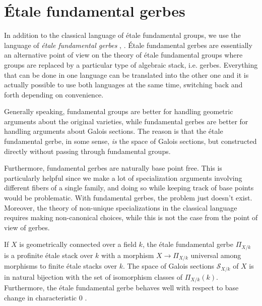 \documentclass[11pt]{amsart}
\theoremstyle{plain}
\theoremstyle{definition}
\newcommand{\1}{\mathbb{1}}
\newcommand{\mc}{\mathcal}
\begin{document}
\section{Étale fundamental gerbes}

In addition to the classical language of étale fundamental groups, we use the language of \emph{étale fundamental gerbes} \cite[\S 8, \S 9]{bv15}, \cite[Appendix A]{anab}. Étale fundamental gerbes are essentially an alternative point of view on the theory of étale fundamental groups where groups are replaced by a particular type of algebraic stack, i.e. gerbes. Everything that can be done in one language can be translated into the other one and it is actually possible to use both languages at the same time, switching back and forth depending on convenience.

Generally speaking, fundamental groups are better for handling geometric arguments about the original varieties, while fundamental gerbes are better for handling arguments about Galois sections. The reason is that the étale fundamental gerbe, in some sense, \emph{is} the space of Galois sections, but constructed directly without passing through fundamental groups.

Furthermore, fundamental gerbes are naturally base point free. This is particularly helpful since we make a lot of specialization arguments involving different fibers of a single family, and doing so while keeping track of base points would be problematic. With fundamental gerbes, the problem just doesn't exist. Moreover, the theory of non-unique specializations in the classical language requires making non-canonical choices, while this is not the case from the point of view of gerbes.

If $X$ is geometrically connected over a field $k$, the étale fundamental gerbe $\Pi_{X/k}$ is a profinite étale stack over $k$ with a morphism $X\to\Pi_{X/k}$ universal among morphisms to finite étale stacks over $k$. The space of Galois sections $\mc{S}_{X/k}$ of $X$ is in natural bijection with the set of isomorphism classes of $\Pi_{X/k}(k)$. Furthermore, the étale fundamental gerbe behaves well with respect to base change in characteristic $0$ \cite[Proposition A.18]{anab}.
\end{document}
